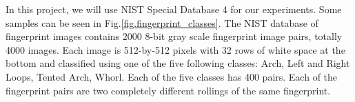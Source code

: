 
In this project, we will use NIST Special Database 4 \cite{nist-db-4} for our experiments. Some samples can be seen in Fig.\ref{fig.fingerprint_classes}.
%
The NIST database of fingerprint images contains 2000 8-bit gray scale fingerprint image pairs, totally 4000 images.
%
Each image is 512-by-512 pixels with 32 rows of white space at the bottom and classified using one of the five following classes: Arch, Left and Right Loops, Tented Arch, Whorl.
%
Each of the five classes has 400 pairs. Each of the fingerprint pairs are two completely different rollings of the same fingerprint.